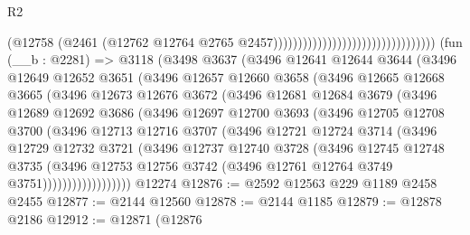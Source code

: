 \begin{lexlean}{R2}
\begin{coremodule}
                                                                (@12758
                                                                  (@2461
                                                                    (@12762
                                                                      @12764
                                                                      @2765
                                                                      @2457)))))))))))))))))))))))))))))))))
    (fun (__b : @2281) =>
    @3118
      (@3498
        @3637
        (@3496
          @12641
          @12644
          @3644
          (@3496
            @12649
            @12652
            @3651
            (@3496
              @12657
              @12660
              @3658
              (@3496
                @12665
                @12668
                @3665
                (@3496
                  @12673
                  @12676
                  @3672
                  (@3496
                    @12681
                    @12684
                    @3679
                    (@3496
                      @12689
                      @12692
                      @3686
                      (@3496
                        @12697
                        @12700
                        @3693
                        (@3496
                          @12705
                          @12708
                          @3700
                          (@3496
                            @12713
                            @12716
                            @3707
                            (@3496
                              @12721
                              @12724
                              @3714
                              (@3496
                                @12729
                                @12732
                                @3721
                                (@3496
                                  @12737
                                  @12740
                                  @3728
                                  (@3496
                                    @12745
                                    @12748
                                    @3735
                                    (@3496
                                      @12753
                                      @12756
                                      @3742
                                      (@3496 @12761 @12764 @3749 @3751))))))))))))))))))
    @12274
@12876 := @2592 @12563 @229 @1189 @2458 @2455
@12877 := @2144 @12560
@12878 := @2144 @1185
@12879 := @12878 @2186
@12912 := @12871
    (@12876

\end{coremodule}
\end{lexlean}
